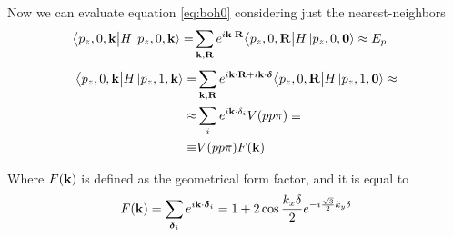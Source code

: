 Now we can evaluate equation \ref{eq:boh0} considering just the nearest-neighbors
\begin{equation}
    \begin{split}
        \big\langle p_z,0,\mathbf{k}\big|H\ket{p_z,0,\mathbf{k}}=&
        \sum_{\mathbf{k},\mathbf{R}}
        e^{i\mathbf{k}\cdot \mathbf{R}}
        \big\langle p_z,0,\mathbf{R}\big|H\ket{p_z,0,\mathbf{0}}\approx E_p
    \end{split}
\end{equation}
\begin{equation}
    \begin{split}
        \big\langle p_z,0,\mathbf{k}\big|H\ket{p_z,1,\mathbf{k}}=&
        \sum_{\mathbf{k},\mathbf{R}}
        e^{i\mathbf{k}\cdot \mathbf{R} + i\mathbf{k}\cdot \boldsymbol \delta}
        \big\langle p_z,0,\mathbf{R}\big|H\ket{p_z,1,\mathbf{0}}\approx\\
        \approx&\sum_{i}e^{i\mathbf{k}\cdot\mathbf{\delta}_i}
        V(pp\pi)\equiv\\
        \equiv&V(pp\pi)F(\mathbf{k})
    \end{split}
\end{equation}

Where $F(\mathbf{k})$ is defined as the geometrical form factor, and it is equal to 
\begin{equation}
     F(\mathbf{k})=\sum_{\boldsymbol\delta_i}e^{i\mathbf{k}\cdot \boldsymbol\delta_i}=
     1+2\cos\frac{k_x \delta}2e^{-i\frac{\sqrt3}2 k_y\delta}
\end{equation}

